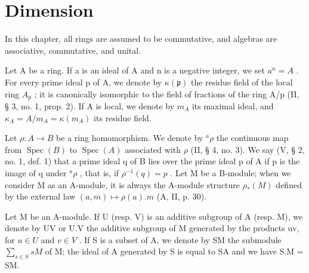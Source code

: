 \chapter{Dimension}

In this chapter, all rings are assumed to be commutative, and algebras are associative, commutative, and unital.

Let A be a ring. If a is an ideal of A and n is a negative integer, we set \(a^{n} = A\) . For every prime ideal p of A, we denote by \(\kappa(\mathfrak{p})\) the residue field of the local ring \(A_{p}\) ; it is canonically isomorphic to the field of fractions of the ring A/p (II, § 3, no. 1, prop. 2). If A is local, we denote by \(m_{A}\) its maximal ideal, and \(\kappa_{A} = A/m_{A} = \kappa(m_{A})\) its residue field.

Let \(\rho: A \to B\) be a ring homomorphism. We denote by \(^a\rho\) the continuous map from \(\operatorname{Spec}(B)\) to \(\operatorname{Spec}(A)\) associated with \(\rho\) (II, § 4, no. 3). We say (V, § 2, no. 1, def. 1) that a prime ideal q of B lies over the prime ideal p of A if p is the image of q under \(^a\rho\) , that is, if \(\rho^{-1}(q) = p\) . Let M be a B-module; when we consider M as an A-module, it is always the A-module structure \(\rho_*(M)\) defined by the external law \((a, m) \mapsto \rho(a).m\) (A, II, p. 30).

Let M be an A-module. If U (resp. V) is an additive subgroup of A (resp. M), we denote by UV or U.V the additive subgroup of M generated by the products uv, for \(u \in U\) and \(v \in V\) . If S is a subset of A, we denote by SM the submodule \(\sum_{s \in S} sM\) of M; the ideal of A generated by S is equal to SA and we have S.M = SM.

